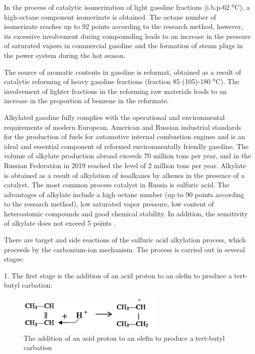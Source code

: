 \documentclass{svproc}
\begin{document}
In the process of catalytic isomerization of light gasoline fractions (i.b.p-62 $^0$C), a high-octane component isomerizate is obtained. The octane number of isomerizate reaches up to 92 points according to the research method, however, its excessive involvement during compounding leads to an increase in the pressure of saturated vapors in commercial gasoline and the formation of steam plugs in the power system during the hot season\cite{alkylation_mod}.

The source of aromatic contents in gasoline is reformat, obtained as a result of catalytic reforming of heavy gasoline fractions (fraction 85 (105)-180 $^0$C). The involvement of lighter fractions in the reforming raw materials leads to an increase in the proportion of benzene in the reformate.

Alkylated gasoline fully complies with the operational and environmental requirements of modern European, American and Russian industrial standards for the production of fuels for automotive internal combustion engines and is an ideal and essential component of reformed environmentally friendly gasoline. The volume of alkylate production abroad exceeds 70 million tons per year, and in the Russian Federation in 2019 reached the level of 2 million tons per year. Alkylate is obtained as a result of alkylation of isoalkanes by alkenes in the presence of a catalyst. The most common process catalyst in Russia is sulfuric acid. The advantages of alkylate include a high octane number (up to 90 points according to the research method), low saturated vapor pressure, low content of heteroatomic compounds and good chemical stability. In addition, the sensitivity of alkylate does not exceed 5 points \cite{cao2019}.

There are target and side reactions of the sulfuric acid alkylation process, which proceeds by the carbonium-ion mechanism. The process is carried out in several stages:

1. The first stage is the addition of an acid proton to an olefin to produce a tert-butyl carbation:
\begin{figure}
\centering
\includegraphics[]{fig1.png}
\caption{The addition of an acid proton to an olefin to produce a tert-butyl carbation}
\label{fig1}
\end{figure}
\end{document}
